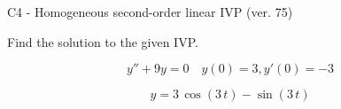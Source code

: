 \begin{exercise}
  \begin{exerciseTitle}C4 - Homogeneous second-order linear IVP (ver. 75)\end{exerciseTitle}
  \begin{exerciseStatement}
    
Find the solution to the given IVP.

    
\[y''+9y = 0 \hspace{1em} y(0) = 3 , y'(0) = -3\]

  \end{exerciseStatement}
  \begin{exerciseAnswer}
    
\[y= 3 \, \cos\left(3 \, t\right) - \sin\left(3 \, t\right)\]

  \end{exerciseAnswer}
\end{exercise}